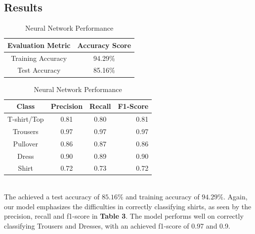 \subsection{Results}

\begin{table}[!ht]
\begin{subtable}[c]{0.4\textwidth}
\footnotesize
\centering
\begin{tabular}{ c | c }
 \toprule
 Evaluation Metric & Accuracy Score  \\
 \midrule
 Training Accuracy & 94.29\% \\
 Test Accuracy & 85.16\% \\
 \bottomrule
\end{tabular}
\captionsetup{justification=centering,margin=1cm}
\end{subtable}
\begin{subtable}[c]{0.6\textwidth}
\footnotesize
\centering
\begin{tabular}{c | c c r}
Class & Precision & Recall & F1-Score\\
\midrule
T-shirt/Top   &    0.81  &    0.80  &    0.81 \\
Trousers   &    0.97  &    0.97  &    0.97 \\
Pullover   &    0.86  &    0.87  &    0.86\\
Dress   &    0.90  &    0.89  &    0.90\\
Shirt   &    0.72  &    0.73  &    0.72\\
\end{tabular}
\captionsetup{justification=centering,margin=1cm}
\end{subtable}
\caption{Neural Network Performance}
\label{nn_evaluation}
\end{table}\\

The  achieved a test accuracy of $85.16\%$ and training accuracy of $94.29\%$.
Again, our model emphasizes the difficulties in correctly classifying shirts, as seen by the precision, recall and f1-score in \textbf{Table 3}.
The model performs well on correctly classifying Trousers and Dresses, with an achieved f1-score of 0.97 and 0.9.







